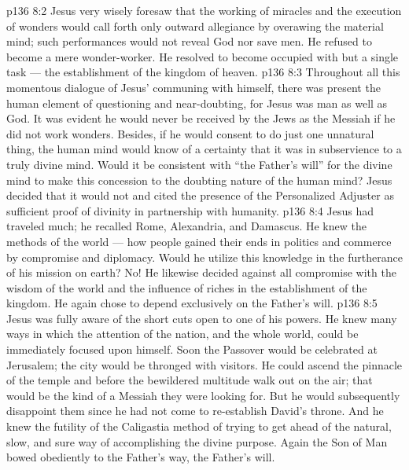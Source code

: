 \vs p136 8:2 Jesus very wisely foresaw that the working of miracles and the execution of wonders would call forth only outward allegiance by overawing the material mind; such performances would not reveal God nor save men. He refused to become a mere wonder\hyp{}worker. He resolved to become occupied with but a single task --- the establishment of the kingdom of heaven.
\vs p136 8:3 \pc Throughout all this momentous dialogue of Jesus’ communing with himself, there was present the human element of questioning and near\hyp{}doubting, for Jesus was man as well as God. It was evident he would never be received by the Jews as the Messiah if he did not work wonders. Besides, if he would consent to do just one unnatural thing, the human mind would know of a certainty that it was in subservience to a truly divine mind. Would it be consistent with “the Father’s will” for the divine mind to make this concession to the doubting nature of the human mind? Jesus decided that it would not and cited the presence of the Personalized Adjuster as sufficient proof of divinity in partnership with humanity.
\vs p136 8:4 \pc Jesus had traveled much; he recalled Rome, Alexandria, and Damascus. He knew the methods of the world --- how people gained their ends in politics and commerce by compromise and diplomacy. Would he utilize this knowledge in the furtherance of his mission on earth? No! He likewise decided against all compromise with the wisdom of the world and the influence of riches in the establishment of the kingdom. He again chose to depend exclusively on the Father’s will.
\vs p136 8:5 Jesus was fully aware of the short cuts open to one of his powers. He knew many ways in which the attention of the nation, and the whole world, could be immediately focused upon himself. Soon the Passover would be celebrated at Jerusalem; the city would be thronged with visitors. He could ascend the pinnacle of the temple and before the bewildered multitude walk out on the air; that would be the kind of a Messiah they were looking for. But he would subsequently disappoint them since he had not come to re\hyp{}establish David’s throne. And he knew the futility of the Caligastia method of trying to get ahead of the natural, slow, and sure way of accomplishing the divine purpose. Again the Son of Man bowed obediently to the Father’s way, the Father’s will.
